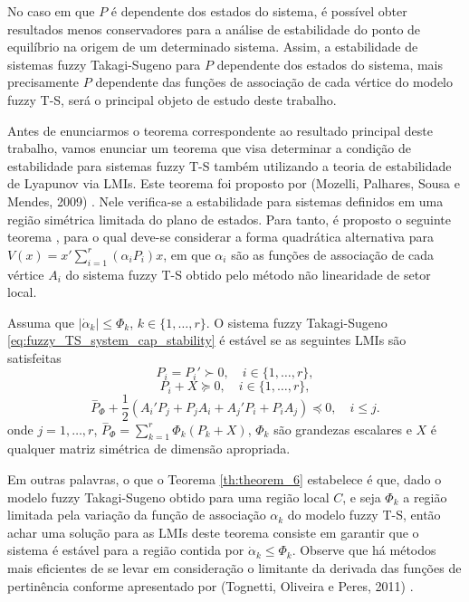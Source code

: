 No caso em que $P$ é dependente dos estados do sistema, é possível obter resultados menos conservadores para a análise de estabilidade do ponto de equilíbrio na origem de um determinado sistema. Assim, a estabilidade de sistemas fuzzy Takagi-Sugeno para $P$ dependente dos estados do sistema, mais precisamente $P$ dependente das funções de associação de cada vértice do modelo fuzzy T-S, será o principal objeto de estudo deste trabalho. 

Antes de enunciarmos o teorema correspondente ao resultado principal deste trabalho, vamos enunciar um teorema que visa determinar a condição de estabilidade para sistemas fuzzy T-S também utilizando a teoria de estabilidade de Lyapunov via LMIs. Este teorema foi proposto por (Mozelli, Palhares, Sousa e Mendes, 2009) \cite{MPSM:2009}. Nele verifica-se a estabilidade para sistemas definidos em uma região simétrica limitada do plano de estados. Para tanto, é proposto o seguinte teorema \cite{MPSM:2009}, para o qual deve-se considerar a forma quadrática alternativa para $V(x) = x'\sum_{i = 1}^{r}(\alpha_iP_i)x$, em que $\alpha_i$ são as funções de associação de cada vértice $A_i$ do sistema fuzzy T-S obtido pelo método não linearidade de setor local.

\begin{theorem}\label{th:theorem_6}
	Assuma que $|\dot{\alpha}_k| \leq \Phi_k$, $k \in \{1, \ldots, r \}$. O sistema fuzzy Takagi-Sugeno \ref{eq:fuzzy_TS_system_cap_stability} é estável se as seguintes LMIs são satisfeitas
	\begin{equation}\label{eq:theorem6_LMI1}
	P_i=P_i'\succ0,\quad i \in \{1, \ldots, r\},
	\end{equation}
	\begin{equation}\label{eq:theorem6_LMI2}
	P_i+X\succeq0,\quad i \in \{1, \ldots, r\},
	\end{equation}
	\begin{equation}\label{eq:theorem6_LMI2}
	\overset{-}{P}_{\Phi}+\dfrac{1}{2}(A_i'P_j+P_jA_i+A_j'P_i+P_iA_j)\preceq 0,\quad i\leq j.
	\end{equation}
	onde $j=1,\hdots ,r$, $\overset{-}{P}_{\Phi} = \sum_{k = 1}^{r}\Phi_k(P_k+X)$, $\Phi_k$ são grandezas escalares e $X$ é qualquer matriz simétrica de dimensão apropriada.
\end{theorem}

Em outras palavras, o que o Teorema \ref{th:theorem_6} estabelece é que, dado o modelo fuzzy Takagi-Sugeno obtido para uma região local $C$, e seja $\Phi_k$ a região limitada pela variação da função de associação $\alpha_k$ do modelo fuzzy T-S, então achar uma solução para as LMIs deste teorema consiste em garantir que o sistema é estável para a região contida por $\dot{\alpha}_k\leq\Phi_k$. Observe que há métodos mais eficientes de se levar em consideração o limitante da derivada das funções de pertinência conforme apresentado por (Tognetti, Oliveira e Peres, 2011) \cite{article:TOP:11b}.

